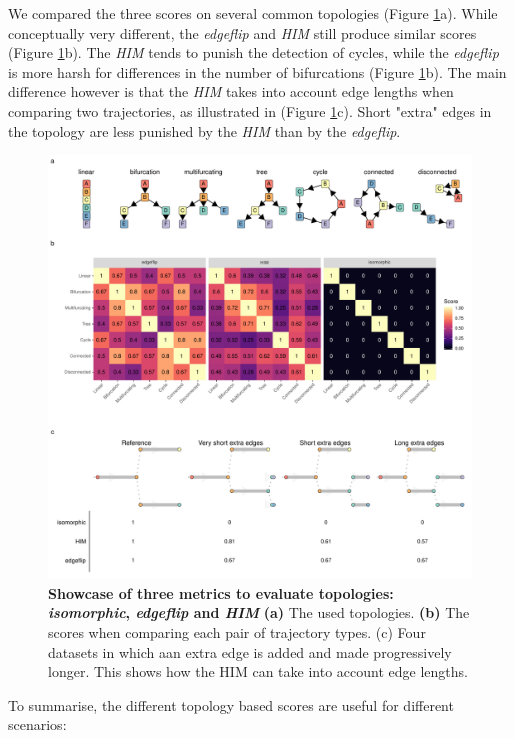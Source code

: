 We compared the three scores on several common topologies (Figure \ref{fig:snote1fig_2}a). While conceptually very different, the \textit{edgeflip} and \textit{HIM} still produce similar scores (Figure \ref{fig:snote1fig_2}b). The \textit{HIM} tends to punish the detection of cycles, while the \textit{edgeflip} is more harsh for differences in the number of bifurcations (Figure \ref{fig:snote1fig_2}b). The main difference however is that the \textit{HIM} takes into account edge lengths when comparing two trajectories, as illustrated in (Figure \ref{fig:snote1fig_2}c). Short "extra" edges in the topology are less punished by the \textit{HIM} than by the \textit{edgeflip}.

\begin{figure}[tbh!]
	\centering\includegraphics[width=\linewidth]{fig/snote1fig_2.pdf}
	\caption{
		\textbf{Showcase of three metrics to evaluate topologies: \textit{isomorphic}, \textit{edgeflip} and \textit{HIM}}
		\textbf{(a)} The used topologies. \textbf{(b)} The scores when comparing each pair of trajectory types. (c) Four datasets in which aan extra edge is added and made progressively longer. This shows how the HIM can take into account edge lengths.
	}
	\label{fig:snote1fig_2}
\end{figure}

To summarise, the different topology based scores are useful for different scenarios:

